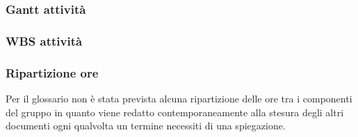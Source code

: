\subsubsection{Gantt attività}

\subsubsection{WBS attività}
\pagebreak

\subsubsection{Ripartizione ore}
Per il glossario non è stata prevista alcuna ripartizione delle ore tra i componenti del gruppo in quanto viene redatto contemporaneamente alla stesura degli altri documenti ogni qualvolta un termine necessiti di una spiegazione.
\bgroup
